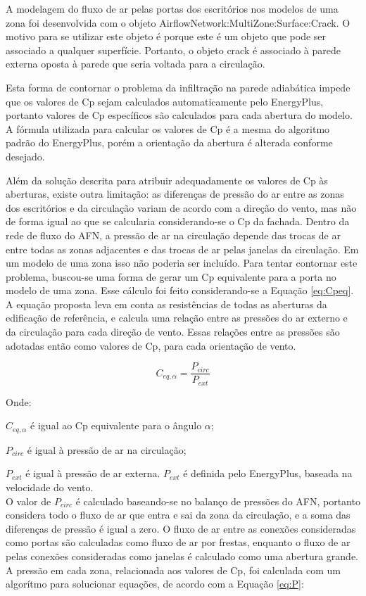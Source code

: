 \documentclass[brazil,hardcopy,openany,a5paper]{ufscthesis}
\begin{document}
		A modelagem do fluxo de ar pelas portas dos escritórios nos modelos de uma zona foi desenvolvida com o objeto AirflowNetwork:MultiZone:Surface:Crack. O motivo para se utilizar este objeto é porque este é um objeto que pode ser associado a qualquer superfície. Portanto, o objeto crack é associado à parede externa oposta à parede que seria voltada para a circulação.
		
		Esta forma de contornar o problema da infiltração na parede adiabática impede que os valores de Cp sejam calculados automaticamente pelo EnergyPlus, portanto valores de Cp específicos são calculados para cada abertura do modelo. A fórmula utilizada para calcular os valores de Cp é a mesma do algoritmo padrão do EnergyPlus, porém a orientação da abertura é alterada conforme desejado.
		
		Além da solução descrita para atribuir adequadamente os valores de Cp às aberturas, existe outra limitação: as diferenças de pressão do ar entre as zonas dos escritórios e da circulação variam de acordo com a direção do vento, mas não de forma igual ao que se calcularia considerando-se o Cp da fachada.
		Dentro da rede de fluxo do AFN, a pressão de ar na circulação depende das trocas de ar entre todas as zonas adjacentes e das trocas de ar pelas janelas da circulação.
		Em um modelo de uma zona isso não poderia ser incluído. Para tentar contornar este problema, buscou-se uma forma de gerar um Cp equivalente para a porta no modelo de uma zona. Esse cálculo foi feito considerando-se a Equação \ref{eq:Cpeq}. A equação proposta leva em conta as resistências de todas as aberturas da edificação de referência, e calcula uma relação entre as pressões do ar externo e da circulação para cada direção de vento. Essas relações entre as pressões são adotadas então como valores de Cp, para cada orientação de vento.
		
		\begin{equation}\label{eq:Cpeq}
		C_{eq,\alpha} = \frac{P_{circ}}{P_{ext}}
		\end{equation}
		
		Onde:
		
		 $C_{eq,\alpha}$ é igual ao Cp equivalente para o ângulo $\alpha$;
		 
		 $P_{circ}$ é igual à pressão de ar na circulação;
		 
		 $P_{ext}$ é igual à pressão de ar externa. $P_{ext}$ é definida pelo EnergyPlus, baseada na velocidade do vento.
		 \\
		 
		 O valor de $P_{circ}$ é calculado baseando-se no balanço de pressões do AFN, portanto considera todo o fluxo de ar que entra e sai da zona da circulação, e a soma das diferenças de pressão é igual a zero.
		 O fluxo de ar entre as conexões consideradas como portas são calculadas como fluxo de ar por frestas, enquanto o fluxo de ar pelas conexões consideradas como janelas é calculado como uma abertura grande.
		 A pressão em cada zona, relacionada aos valores de Cp, foi calculada com um algorítmo para solucionar equações, de acordo com a Equação \ref{eq:P}:
		 
\end{document}
